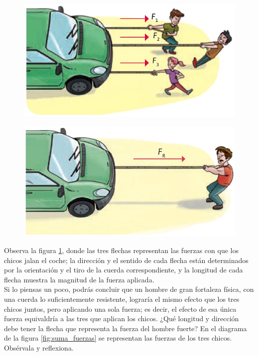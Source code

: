 \documentclass[11pt]{book}
\begin{document}
\begin{minipage}[t]{0.45\textwidth}
    \begin{figure}[H]
        \centering
        \includegraphics[width=0.8\linewidth]{jalando_carro.jpg}
        \label{fig:jalando_carro}
    \end{figure}
\end{minipage}\hfill
\begin{minipage}[t]{0.45\textwidth}
    \begin{figure}[H]
        \centering
        \includegraphics[width=0.8\linewidth]{jalando_carro2.jpg}
        \label{fig:jalando_carro2}
    \end{figure}%
\end{minipage}


Observa la figura \ref{fig:jalando_carro}, donde las tres flechas representan las fuerzas con que
los chicos
jalan el coche; la dirección y el sentido de cada flecha están determinados por la orientación
y el tiro de la cuerda correspondiente, y la longitud de cada flecha muestra la magnitud de la
fuerza aplicada.\\

Si lo piensas un poco, podrás concluir que un hombre de gran fortaleza física, con una cuerda
lo suficientemente resistente, lograría el mismo efecto que los tres chicos juntos, pero aplicando
una sola fuerza; es decir, el efecto de esa única fuerza equivaldría a las tres que aplican los
chicos. ¿Qué longitud y dirección debe tener la flecha que representa la fuerza del hombre fuerte? En el
diagrama de la figura \ref{fig:suma_fuerzas} se representan las fuerzas de los tres chicos. Obsérvala y reflexiona.\\
\end{document}
